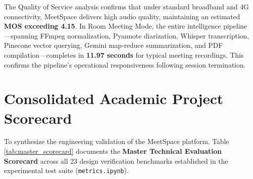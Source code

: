 \documentclass[12pt,oneside,letterpaper]{report}
\numberwithin{equation}{chapter} %
\begin{document}
The Quality of Service analysis confirms that under standard broadband and 4G connectivity, MeetSpace delivers high audio quality, maintaining an estimated \textbf{MOS exceeding 4.15}. In Room Meeting Mode, the entire intelligence pipeline---spanning FFmpeg normalization, Pyannote diarization, Whisper transcription, Pinecone vector querying, Gemini map-reduce summarization, and PDF compilation---completes in \textbf{11.97 seconds} for typical meeting recordings. This confirms the pipeline's operational responsiveness following session termination.

\section{Consolidated Academic Project Scorecard}
To synthesize the engineering validation of the MeetSpace platform, Table \ref{tab:master_scorecard} documents the \textbf{Master Technical Evaluation Scorecard} across all 23 design verification benchmarks established in the experimental test suite (\texttt{metrics.ipynb}).
\end{document}
